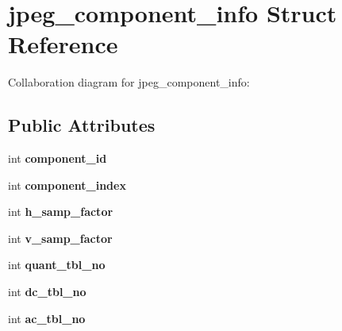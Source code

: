 \hypertarget{structjpeg__component__info}{\section{jpeg\+\_\+component\+\_\+info Struct Reference}
\label{structjpeg__component__info}
}


Collaboration diagram for jpeg\+\_\+component\+\_\+info\+:
\subsection*{Public Attributes}
\begin{DoxyCompactItemize}
\item 
\hypertarget{structjpeg__component__info_a205782ff7ec47c58cb470f121247ea8d}{int {\bfseries component\+\_\+id}}\label{structjpeg__component__info_a205782ff7ec47c58cb470f121247ea8d}

\item 
\hypertarget{structjpeg__component__info_aa29b9e1c664a9b0b8a1c3069ad167817}{int {\bfseries component\+\_\+index}}\label{structjpeg__component__info_aa29b9e1c664a9b0b8a1c3069ad167817}

\item 
\hypertarget{structjpeg__component__info_a3a8e122fa2eee3c7bede586d371fe202}{int {\bfseries h\+\_\+samp\+\_\+factor}}\label{structjpeg__component__info_a3a8e122fa2eee3c7bede586d371fe202}

\item 
\hypertarget{structjpeg__component__info_a83b263da2a749a8fe96be728889af0df}{int {\bfseries v\+\_\+samp\+\_\+factor}}\label{structjpeg__component__info_a83b263da2a749a8fe96be728889af0df}

\item 
\hypertarget{structjpeg__component__info_a0a9d70b6a95d3ca58a34a7ea8bfefbf8}{int {\bfseries quant\+\_\+tbl\+\_\+no}}\label{structjpeg__component__info_a0a9d70b6a95d3ca58a34a7ea8bfefbf8}

\item 
\hypertarget{structjpeg__component__info_a304fa583caa0601abc7077a218988854}{int {\bfseries dc\+\_\+tbl\+\_\+no}}\label{structjpeg__component__info_a304fa583caa0601abc7077a218988854}

\item 
\hypertarget{structjpeg__component__info_adfea67573a39b232c3d82ac808539a83}{int {\bfseries ac\+\_\+tbl\+\_\+no}}\label{structjpeg__component__info_adfea67573a39b232c3d82ac808539a83}


\end{DoxyCompactItemize}
